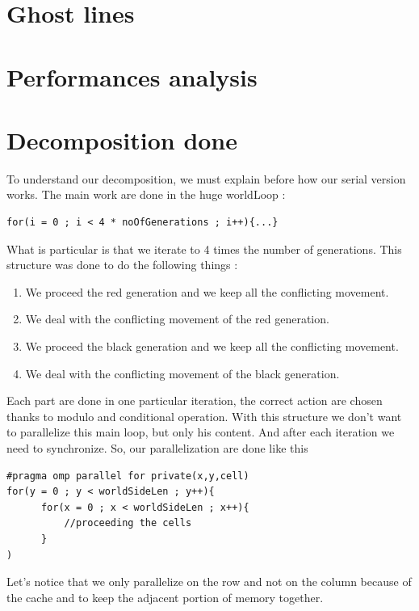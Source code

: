 \documentclass[a4paper,10pt]{article}
\begin{document}
\section*{Ghost lines}

\section*{Performances analysis}


\section*{Decomposition done}

To understand our decomposition, we must explain before how our serial version works.
The main work are done in the huge worldLoop :

\begin{lstlisting}
for(i = 0 ; i < 4 * noOfGenerations ; i++){...}
\end{lstlisting}

What is particular is that we iterate to 4 times the number of generations. This structure was done to do the following things :

\begin{enumerate}
 \item We proceed the red generation and we keep all the conflicting movement.
 \item We deal with the conflicting movement of the red generation.
 \item We proceed the black generation and we keep all the conflicting movement.
 \item We deal with the conflicting movement of the black generation.
\end{enumerate}

Each part are done in one particular iteration, the correct action are chosen thanks to modulo and conditional operation.
With this structure we don't want to parallelize this main loop, but only his content. 
And after each iteration we need to synchronize. So, our parallelization are done like this 

\begin{lstlisting}
#pragma omp parallel for private(x,y,cell)
for(y = 0 ; y < worldSideLen ; y++){
      for(x = 0 ; x < worldSideLen ; x++){
	      //proceeding the cells
      }
)
\end{lstlisting}

Let's notice that we only parallelize on the row and not on the column because of the cache and to keep the adjacent portion of memory
together.
\end{document}

